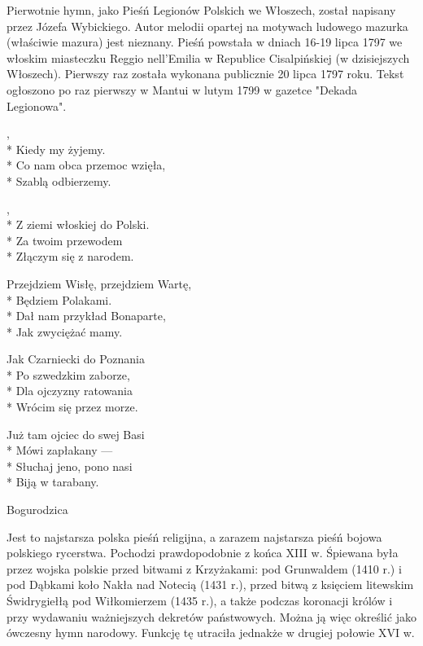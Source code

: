 \begin{info}Pierwotnie hymn, jako Pieśń Legionów Polskich we Włoszech, został napisany przez Józefa Wybickiego. Autor melodii opartej na motywach ludowego mazurka (właściwie mazura) jest nieznany. Pieśń powstała w dniach 16-19 lipca 1797 we włoskim miasteczku Reggio nell'Emilia w Republice Cisalpińskiej (w dzisiejszych Włoszech). Pierwszy raz została wykonana publicznie 20 lipca 1797 roku. Tekst ogłoszono po raz pierwszy w Mantui w lutym 1799 w gazetce "Dekada Legionowa".\end{info}

\begin{lyrics}[longestline={Przejdziem Wisłę, przejdziem Wartę,}]

,\\*
Kiedy my żyjemy.\\*
Co nam obca przemoc wzięła,\\*
Szablą odbierzemy.

\begin{chorus}
,\\*
Z ziemi włoskiej do Polski.\\*
Za twoim przewodem\\*
Złączym się z narodem.
\end{chorus}

Przejdziem Wisłę, przejdziem Wartę,\\*
Będziem Polakami.\\*
Dał nam przykład Bonaparte,\\*
Jak zwyciężać mamy.

\chorusref

Jak Czarniecki do Poznania\\*
Po szwedzkim zaborze,\\*
Dla ojczyzny ratowania\\*
Wrócim się przez morze.

\chorusref

Już tam ojciec do swej Basi\\*
Mówi zapłakany —\\*
Słuchaj jeno, pono nasi\\*
Biją w tarabany.

\chorusref
\end{lyrics}



\song
{Bogurodzica}
\begin{info}Jest to najstarsza polska pieśń religijna, a zarazem najstarsza pieśń bojowa polskiego rycerstwa. Pochodzi prawdopodobnie z końca XIII w. Śpiewana była przez wojska polskie przed bitwami z Krzyżakami: pod Grunwaldem (1410 r.) i pod Dąbkami koło Nakła nad Notecią (1431 r.), przed bitwą z księciem litewskim Świdrygiełłą pod Wiłkomierzem (1435 r.), a także podczas koronacji królów i przy wydawaniu ważniejszych dekretów państwowych. Można ją więc określić jako ówczesny hymn narodowy. Funkcję tę utraciła jednakże w drugiej połowie XVI w.\end{info}

